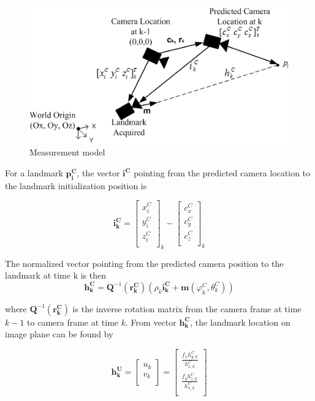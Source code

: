 \begin{figure}[h]
\centering
\includegraphics[width=12cm, keepaspectratio=true]{./Figures/measurement_model.jpg}
\caption{Measurement model}
\label{fig:measurement_model}
\end{figure}
\FloatBarrier
For a landmark $\boldsymbol{p_{i}^{C}}$, the vector $\boldsymbol{i^{C}}$
pointing from the predicted camera location to the landmark
initialization position is

\begin{equation}
\boldsymbol{i_{k}^{C}}=\begin{bmatrix}
x_{i}^{C} \\
y_{i}^{C} \\
z_{i}^{C} \\
\end{bmatrix}_{k}-\begin{bmatrix}
c_{x}^{C} \\
c_{y}^{C} \\
c_{z}^{C} \\
\end{bmatrix}_{k}
\end{equation}

The normalized vector pointing from the predicted camera position to the 
landmark at time k is then 
\begin{equation}
  \boldsymbol{h_{k}^{C}}=\boldsymbol{Q}^{-1}\left(\boldsymbol{r_{k}^{C}}\right)
  \left(\rho_{k}\boldsymbol{i_{k}^{C}}+
    \boldsymbol{m}\left(\varphi_k^{C},\theta _{k}^{C}\right)\right)
\end{equation}

\noindent where $\boldsymbol{Q}^{-1}(\boldsymbol{r_{k}^{C}})$ is the inverse
rotation matrix from the camera frame at time $k-1$ to camera frame at
time $k$. From vector $\boldsymbol{h_{k}^{C}}$, the landmark location on
image plane can be found by

\begin{equation}
\boldsymbol{h_{k}^{U}}= \begin{bmatrix}
u_{k} \\
v_{k} \\
\end{bmatrix}=\begin{bmatrix}
\frac{f_{x}h_{y,k}^{C}}{h_{x,k}^{C}} \\
\frac{f_{y}h_{z,k}^{C}}{h_{x,k}^{C}} \\
\end{bmatrix}
\end{equation}

